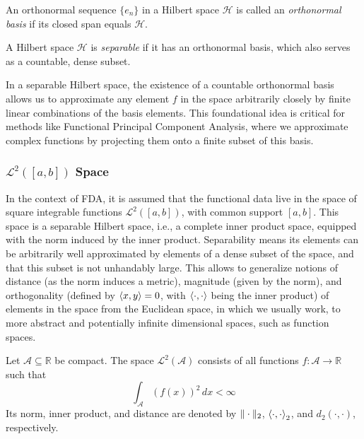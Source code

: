 \begin{definition}
    An orthonormal sequence \( \{ e_n \} \) in a Hilbert space \( \mathcal{H} \) is called 
    an \textit{orthonormal basis} if its closed span equals \( \mathcal{H} \).
\end{definition}

\begin{definition}
    A Hilbert space \( \mathcal{H} \) is \textit{separable} if it has an orthonormal basis, 
    which also serves as a countable, dense subset.
\end{definition}

In a separable Hilbert space, the existence of a countable orthonormal basis allows us to 
approximate any element \( f \) in the space arbitrarily closely by finite linear combinations 
of the basis elements. This foundational idea is critical for methods like Functional Principal 
Component Analysis, where we approximate complex functions by projecting them onto a finite 
subset of this basis.

\subsubsection{$\mathcal{L}^2([a, b])$ Space}
\label{sec:l2 space}
In the context of FDA, it is assumed that the functional data live in
the space of square integrable functions $\mathcal{L}^2([a,b])$, with common
support $[a,b]$. This space is a separable Hilbert space, i.e., a complete inner
product space, equipped with the norm induced by the inner product. Separability means
its elements can be arbitrarily well approximated by elements of a dense subset of the
space, and that this subset is not unhandably large.
This allows to generalize notions of distance (as the norm induces a
metric), magnitude (given by the norm), and orthogonality (defined by
$\left \langle x, y \right \rangle = 0$, with $\left \langle \cdot, \cdot \right \rangle$ being the inner product) of elements
in the space from the Euclidean space, in which we usually work, to more
abstract and potentially infinite dimensional spaces, such as function
spaces.

\begin{definition}
    Let $\mathcal{A} \subseteq \mathbb{R}$ be compact. The space \( \mathcal{L}^2(\mathcal{A}) \)
    consists of all functions \( f: \mathcal{A} \to \mathbb{R} \) such that
    \[
    \int_{\mathcal{A}} (f(x))^2 \, dx < \infty
    \]
    Its norm, inner product, and distance are denoted by $\|\cdot\|_2$,
    $\left \langle \cdot, \cdot \right \rangle_2$, and $d_2(\cdot, \cdot)$, respectively.
\end{definition}

